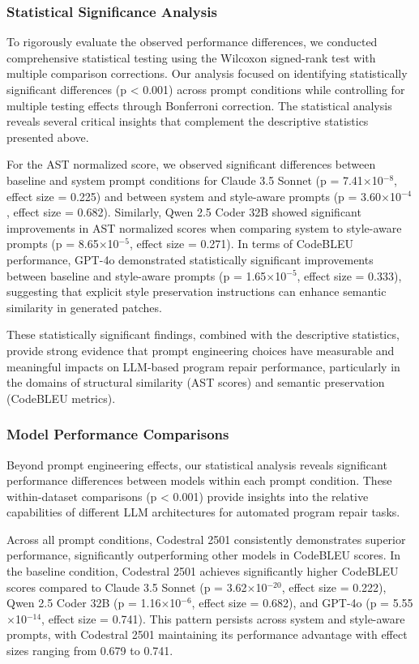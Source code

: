 \subsubsection{Statistical Significance Analysis}
To rigorously evaluate the observed performance differences, we conducted comprehensive statistical testing using the Wilcoxon signed-rank test with multiple comparison corrections. Our analysis focused on identifying statistically significant differences (p < 0.001) across prompt conditions while controlling for multiple testing effects through Bonferroni correction. The statistical analysis reveals several critical insights that complement the descriptive statistics presented above.

For the AST normalized score, we observed significant differences between baseline and system prompt conditions for Claude 3.5 Sonnet (p = 7.41$\times$10$^{-8}$, effect size = 0.225) and between system and style-aware prompts (p = 3.60$\times$10$^{-4}$, effect size = 0.682). Similarly, Qwen 2.5 Coder 32B showed significant improvements in AST normalized scores when comparing system to style-aware prompts (p = 8.65$\times$10$^{-5}$, effect size = 0.271). In terms of CodeBLEU performance, GPT-4o demonstrated statistically significant improvements between baseline and style-aware prompts (p = 1.65$\times$10$^{-5}$, effect size = 0.333), suggesting that explicit style preservation instructions can enhance semantic similarity in generated patches.

These statistically significant findings, combined with the descriptive statistics, provide strong evidence that prompt engineering choices have measurable and meaningful impacts on LLM-based program repair performance, particularly in the domains of structural similarity (AST scores) and semantic preservation (CodeBLEU metrics).

\subsubsection{Model Performance Comparisons}
Beyond prompt engineering effects, our statistical analysis reveals significant performance differences between models within each prompt condition. These within-dataset comparisons (p < 0.001) provide insights into the relative capabilities of different LLM architectures for automated program repair tasks.

Across all prompt conditions, Codestral 2501 consistently demonstrates superior performance, significantly outperforming other models in CodeBLEU scores. In the baseline condition, Codestral 2501 achieves significantly higher CodeBLEU scores compared to Claude 3.5 Sonnet (p = 3.62$\times$10$^{-20}$, effect size = 0.222), Qwen 2.5 Coder 32B (p = 1.16$\times$10$^{-6}$, effect size = 0.682), and GPT-4o (p = 5.55$\times$10$^{-14}$, effect size = 0.741). This pattern persists across system and style-aware prompts, with Codestral 2501 maintaining its performance advantage with effect sizes ranging from 0.679 to 0.741.

